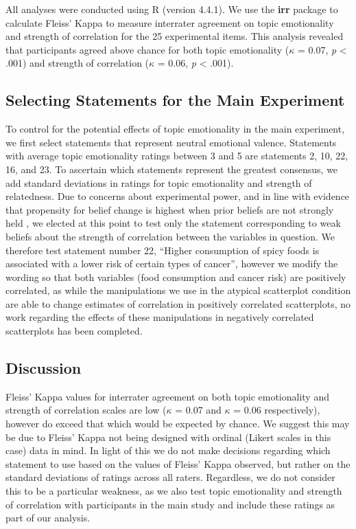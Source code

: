 \documentclass[manuscript,screen,review]{acmart}
\begin{document}
All analyses were conducted using R (version 4.4.1). We use the
\textbf{irr} package to calculate Fleiss' Kappa to measure interrater
agreement on topic emotionality and strength of correlation for the 25
experimental items. This analysis revealed that participants agreed
above chance for both topic emotionality (\(\kappa\) = 0.07, \emph{p}
\textless{} .001) and strength of correlation (\(\kappa\) = 0.06,
\emph{p} \textless{} .001).

\subsection{Selecting Statements for the Main
Experiment}\label{sec-selecting-statements}

To control for the potential effects of topic emotionality in the main
experiment, we first select statements that represent neutral emotional
valence. Statements with average topic emotionality ratings between 3
and 5 are statements 2, 10, 22, 16, and 23. To ascertain which
statements represent the greatest consensus, we add standard deviations
in ratings for topic emotionality and strength of relatedness. Due to
concerns about experimental power, and in line with evidence that
propensity for belief change is highest when prior beliefs are not
strongly held \citep{xiong_2022, markant_2023}, we elected at this point
to test only the statement corresponding to weak beliefs about the
strength of correlation between the variables in question. We therefore
test statement number 22, ``Higher consumption of spicy foods is
associated with a lower risk of certain types of cancer'', however we
modify the wording so that both variables (food consumption and cancer
risk) are positively correlated, as while the manipulations we use in
the atypical scatterplot condition are able to change estimates of
correlation in positively correlated scatterplots, no work regarding the
effects of these manipulations in negatively correlated scatterplots has
been completed.

\subsection{Discussion}\label{sec-discussion-pre}

Fleiss' Kappa values for interrater agreement on both topic emotionality
and strength of correlation scales are low (\(\kappa\) = 0.07 and
\(\kappa\) = 0.06 respectively), however do exceed that which would be
expected by chance. We suggest this may be due to Fleiss' Kappa not
being designed with ordinal (Likert scales in this case) data in mind.
In light of this we do not make decisions regarding which statement to
use based on the values of Fleiss' Kappa observed, but rather on the
standard deviations of ratings across all raters. Regardless, we do not
consider this to be a particular weakness, as we also test topic
emotionality and strength of correlation with participants in the main
study and include these ratings as part of our analysis.
\end{document}
